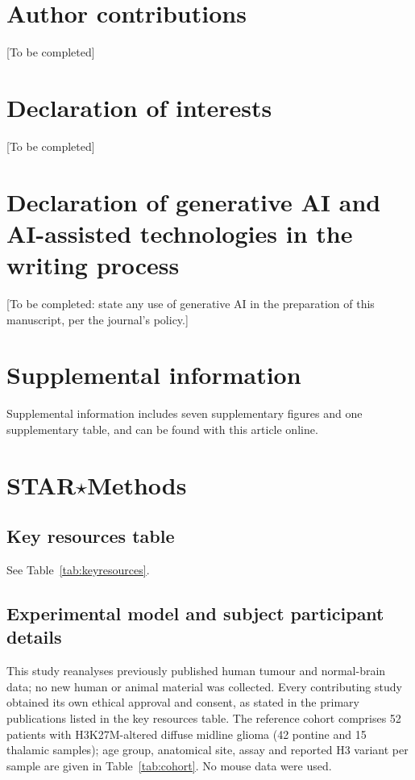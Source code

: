 \documentclass[12pt,a4paper]{article}
\begin{document}


\newpage
\section{Author contributions}

[To be completed]

\section{Declaration of interests}

[To be completed]

\section{Declaration of generative AI and AI-assisted technologies in the writing process}

[To be completed: state any use of generative AI in the preparation of this manuscript, per the journal's policy.]

\section{Supplemental information}

Supplemental information includes seven supplementary figures and one supplementary table, and can be found with
this article online.

\section{STAR$\star$Methods}

\subsection{Key resources table}

\noindent See Table~\ref{tab:keyresources}.



\subsection{Experimental model and subject participant details}

This study reanalyses previously published human tumour and normal-brain data; no new human or animal material was
collected. Every contributing study obtained its own ethical approval and consent, as stated in the primary
publications listed in the key resources table. The reference cohort comprises 52 patients with H3K27M-altered
diffuse midline glioma (42 pontine and 15 thalamic samples); age group, anatomical site, assay and reported H3
variant per sample are given in Table~\ref{tab:cohort}. No mouse data were used.
\end{document}
